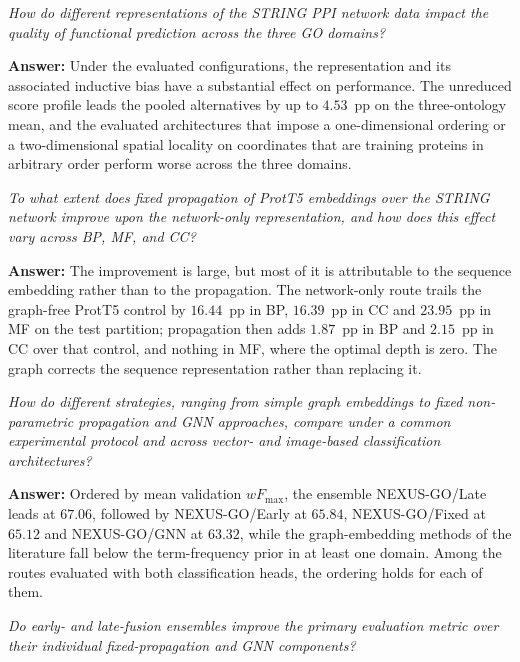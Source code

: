 \documentclass[Ingles]{ic-tese-v3}
\begin{document}
\begin{description}
\setlength{\itemsep}{4pt}\setlength{\parsep}{2pt}

\item[RQ1] \emph{How do different representations of the STRING PPI network data impact the
quality of functional prediction across the three GO domains?}

\textbf{Answer:} Under the evaluated configurations, the representation and its associated
inductive bias have a substantial effect on performance. The unreduced score profile leads the
pooled alternatives by up to $4.53$~pp on the three-ontology mean, and the evaluated
architectures that impose a one-dimensional ordering or a two-dimensional spatial locality on
coordinates that are training proteins in arbitrary order perform worse across the three
domains.

\item[RQ2] \emph{To what extent does fixed propagation of ProtT5 embeddings over the STRING
network improve upon the network-only representation, and how does this effect vary across
BP, MF, and CC?}

\textbf{Answer:} The improvement is large, but most of it is attributable to the sequence
embedding rather than to the propagation. The network-only route trails the graph-free
ProtT5 control by $16.44$~pp in BP, $16.39$~pp in CC and $23.95$~pp in MF on the test
partition; propagation then adds $1.87$~pp in BP and $2.15$~pp in CC over that control, and
nothing in MF, where the optimal depth is zero. The graph corrects the sequence
representation rather than replacing it.

\item[RQ3] \emph{How do different strategies, ranging from simple graph embeddings to fixed
non-parametric propagation and GNN approaches, compare under a common experimental protocol
and across vector- and image-based classification architectures?}

\textbf{Answer:} Ordered by mean validation $wF_{\max}$, the ensemble NEXUS-GO/Late leads at
$67.06$, followed by NEXUS-GO/Early at $65.84$, NEXUS-GO/Fixed at $65.12$ and NEXUS-GO/GNN at
$63.32$, while the graph-embedding methods of the literature fall below the term-frequency prior
in at least one domain. Among the routes evaluated with both classification heads, the ordering
holds for each of them.


\item[RQ4] \emph{Do early- and late-fusion ensembles improve the primary evaluation metric
over their individual fixed-propagation and GNN components?}


\end{description}
\end{document}
